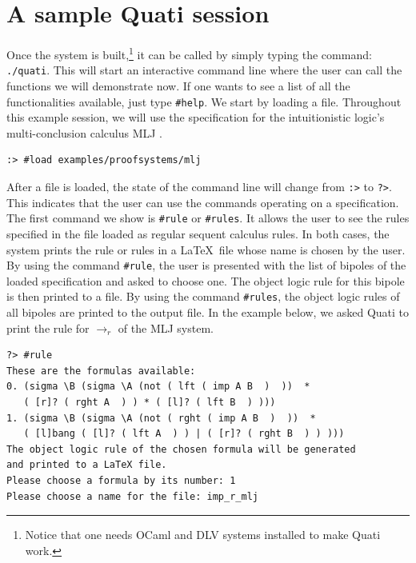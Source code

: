 \documentclass{llncs}
\begin{document}
\section{A sample Quati session}

Once the system is built,\footnote{Notice that one needs OCaml and DLV systems installed to make
Quati work.} it can be called by simply typing the command:
\texttt{./quati}. This will start an interactive command line where the user can
call the functions we will demonstrate now. If one wants to see a list of all
the functionalities available, just type \texttt{\#help}. We start by loading a
file. Throughout this example session, we will use the specification for the
intuitionistic logic's multi-conclusion calculus MLJ \cite{maehara54nmj}.
%
\vspace{-1mm}

{\small
\begin{verbatim}
:> #load examples/proofsystems/mlj
\end{verbatim}
}

After a file is loaded, the state of the command line will change from
\texttt{:>} to \texttt{?>}. This indicates that the user can use the commands
operating on a specification. The first command we show is \texttt{\#rule} or
\texttt{\#rules}. It allows the user to see the rules specified in the file
loaded as regular sequent calculus rules. In both cases, the system prints the
rule or rules in a \LaTeX\ file whose name is chosen by the user. By using the
command \texttt{\#rule}, the user is presented with the list of bipoles of the
loaded specification and asked to choose one. The object logic rule for this
bipole is then printed to a file. By using the command \texttt{\#rules}, the
object logic rules of all bipoles are printed to the output file. In the example
below, we asked Quati to print the rule for $\rightarrow_r$ of the MLJ system.
\vspace{-1mm}

{\small
\begin{verbatim}
?> #rule
These are the formulas available: 
0. (sigma \B (sigma \A (not ( lft ( imp A B  )  ))  * 
   ( [r]? ( rght A  ) ) * ( [l]? ( lft B  ) )))
1. (sigma \B (sigma \A (not ( rght ( imp A B  )  ))  * 
   ( [l]bang ( [l]? ( lft A  ) ) | ( [r]? ( rght B  ) ) )))
The object logic rule of the chosen formula will be generated 
and printed to a LaTeX file.
Please choose a formula by its number: 1
Please choose a name for the file: imp_r_mlj
\end{verbatim}
}
\end{document}
